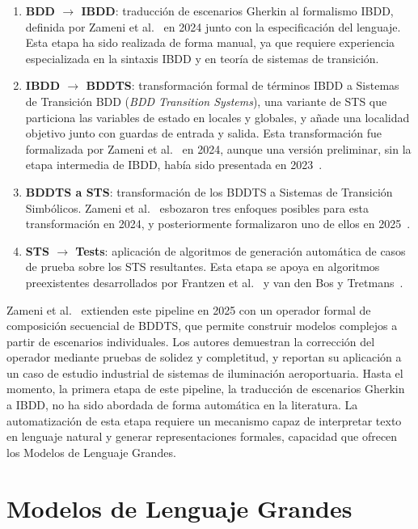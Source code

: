 \begin{enumerate}
  \item \textbf{BDD $\rightarrow$ IBDD}: traducción de escenarios Gherkin al formalismo IBDD, definida por Zameni et al.~\cite{zameni2024ibdd} en 2024 junto con la especificación del lenguaje. Esta etapa ha sido realizada de forma manual, ya que requiere experiencia especializada en la sintaxis IBDD y en teoría de sistemas de transición.
  \item \textbf{IBDD $\rightarrow$ BDDTS}: transformación formal de términos IBDD a Sistemas de Transición BDD (\textit{BDD Transition Systems}), una variante de STS que particiona las variables de estado en locales y globales, y añade una localidad objetivo junto con guardas de entrada y salida. Esta transformación fue formalizada por Zameni et al.~\cite{zameni2024ibdd} en 2024, aunque una versión preliminar, sin la etapa intermedia de IBDD, había sido presentada en 2023~\cite{zameni2023bddts}.
  \item \textbf{BDDTS a STS}: transformación de los BDDTS a Sistemas de Transición Simbólicos. Zameni et al.~\cite{zameni2024ibdd} esbozaron tres enfoques posibles para esta transformación en 2024, y posteriormente formalizaron uno de ellos en 2025~\cite{zameni2025composition}.
  \item \textbf{STS $\rightarrow$ Tests}: aplicación de algoritmos de generación automática de casos de prueba sobre los STS resultantes. Esta etapa se apoya en algoritmos preexistentes desarrollados por Frantzen et al.~\cite{frantzen2006symbolic} y van den Bos y Tretmans~\cite{vandenbos2019coverage}.
\end{enumerate}

Zameni et al.~\cite{zameni2025composition} extienden este pipeline en 2025 con un operador formal de composición secuencial de BDDTS, que permite construir modelos complejos a partir de escenarios individuales. Los autores demuestran la corrección del operador mediante pruebas de solidez y completitud, y reportan su aplicación a un caso de estudio industrial de sistemas de iluminación aeroportuaria. Hasta el momento, la primera etapa de este pipeline, la traducción de escenarios Gherkin a IBDD, no ha sido abordada de forma automática en la literatura. La automatización de esta etapa requiere un mecanismo capaz de interpretar texto en lenguaje natural y generar representaciones formales, capacidad que ofrecen los Modelos de Lenguaje Grandes.

\section{Modelos de Lenguaje Grandes}
\label{sec:llm}


